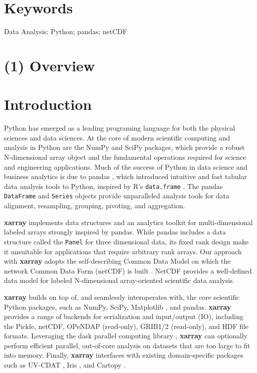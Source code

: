 \documentclass{jors}
\begin{document}
\section*{Keywords}

{Data Analysis; Python; pandas; netCDF}

\section*{(1) Overview}

\section*{Introduction}

Python has emerged as a leading programing language for both the physical sciences and data sciences.
At the core of modern scientific computing and analysis in Python are the NumPy \citep{Jones_2001} and SciPy \citep{van_der_Walt_2011} packages, which provide a robust N-dimensional array object and the fundamental operations required for science and engineering applications.
Much of the success of Python in data science and business analytics is due to pandas \citep{mckinney_2010}, which introduced intuitive and fast tabular data analysis tools to Python, inspired by R's \verb|data.frame| \citep{r_2013}.
The pandas \verb|DataFrame| and \verb|Series| objects provide unparalleled analysis tools for data alignment, resampling, grouping, pivoting, and aggregation.

\textbf{xarray} implements data structures and an analytics toolkit for multi-dimensional
labeled arrays strongly inspired by pandas.
While pandas includes a data structure called the \verb|Panel| for three dimensional data, its fixed rank design make it unsuitable for applications that require arbitrary rank arrays.
Our approach with \textbf{xarray} adopts the self-describing Common Data Model on which the network Common Data Form (netCDF) is built \citep{Rew_1990,Brown_1993}.
NetCDF provides a well-defined data model for labeled N-dimensional array-oriented scientific data analysis.

\textbf{xarray} builds on top of, and seamlessly interoperates with, the core scientific Python packages, such as NumPy, SciPy, Matplotlib \citep{Hunter_2007}, and pandas.
\textbf{xarray} provides a range of backends for serialization and input/output (IO), including the Pickle, netCDF, OPeNDAP (read-only), GRIB1/2 (read-only), and HDF file formats.
Leveraging the dask parallel computing library \cite{dask}, \textbf{xarray} can optionally perform efficient parallel, out-of-core analysis on datasets that are too large to fit into memory.
Finally, \textbf{xarray} interfaces with existing domain-specific packages such as UV-CDAT \citep{uvcdat}, Iris \citep{Iris}, and Cartopy \citep{Cartopy}.
\end{document}
